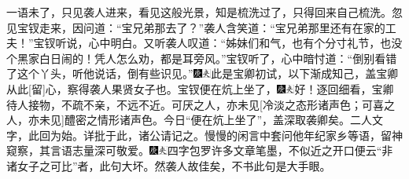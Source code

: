 一语未了，只见袭人进来，看见这般光景，知是梳洗过了，只得回来自己梳洗。忽见宝钗走来，因问道：“宝兄弟那去了？”袭人含笑道：“宝兄弟那里还有在家的工夫！”宝钗听说，心中明白。又听袭人叹道：“姊妹们和气，也有个分寸礼节，也没个黑家白日闹的！凭人怎么劝，都是耳旁风。”宝钗听了，心中暗忖道：“倒别看错了这个丫头，听他说话，倒有些识见。”{\includegraphics[width=3mm]{../Images/00004}\includegraphics[width=3mm]{../Images/00012}\footnotesize \kaishu 此是宝卿初试，以下渐成知己，盖宝卿从此{[}留{]}心，察得袭人果贤女子也。}宝钗便在炕上坐了，{\includegraphics[width=3mm]{../Images/00004}\includegraphics[width=3mm]{../Images/00012}\footnotesize \kaishu 好！逐回细看，宝卿待人接物，不疏不亲，不远不近。可厌之人，亦未见{[}冷淡之态形诸声色；可喜之人，亦未见{]}醴密之情形诸声色。今日“便在炕上坐了”，盖深取袭卿矣。二人文字，此回为始。详批于此，诸公请记之。}慢慢的闲言中套问他年纪家乡等语，留神窥察，其言语志量深可敬爱。{\includegraphics[width=3mm]{../Images/00004}\includegraphics[width=3mm]{../Images/00012}\footnotesize \kaishu 四字包罗许多文章笔墨，不似近之开口便云“非诸女子之可比”者，此句大坏。然袭人故佳矣，不书此句是大手眼。}

